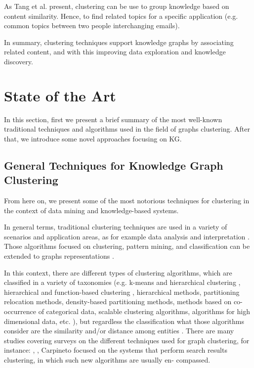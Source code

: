 \documentclass[runningheads]{llncs}
\begin{document}
As Tang et al. \cite{Tang} present, clustering can be use to group knowledge based on content similarity. Hence, to find related topics for a specific application (e.g. common topics between two people interchanging emails).

In summary, clustering techniques support knowledge graphs by associating related content, and with this improving data exploration and knowledge discovery.


\section{State of the Art}\label{state-art}
In this section, first we present a brief summary of the most well-known traditional techniques and algorithms used in the field of graphs clustering. After that, we introduce some novel approaches focusing on KG. 

\subsection{General Techniques for Knowledge Graph Clustering} \label{general-techniques}
From here on, we present some of the most notorious techniques for clustering in the context of data mining and knowledge-based systems.

In general terms, traditional clustering techniques are used in a variety of scenarios and application areas, as for example data analysis and interpretation \cite{Pedrycz}. Those algorithms focused on clustering, pattern mining, and classification can be extended to graphs representations \cite{Aggarwal}.

In this context, there are different types of clustering algorithms, which are classified in a variety of taxonomies (e.g. k-means and hierarchical clustering \cite{Zacharski}, hierarchical and function-based clustering \cite{Pedrycz}, hierarchical methods, partitioning relocation methods, density-based partitioning methods, methods based on co-occurrence of categorical data, scalable clustering algorithms, algorithms for high dimensional data, etc. \cite{Berkhin}), but regardless the classification what those algorithms consider are the similarity and/or distance among entities \cite{Pedrycz}.
There are many studies covering surveys on the different techniques used for graph clustering, for instance: \cite{Schaeffer}, \cite{Aggarwal}, \cite{Carpineto} Carpineto focused on the systems that perform search results clustering, in which such new algorithms are usually en- compassed.
\end{document}
